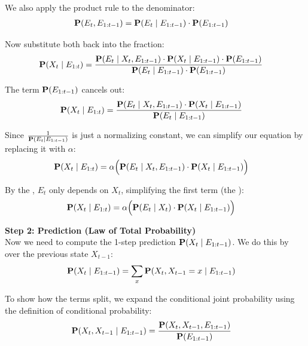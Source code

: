 We also apply the product rule to the denominator:
\begin{align*}
\textbf{P}(E_t, E_{1:t-1}) &= \textbf{P}(E_t \mid E_{1:t-1}) \cdot \textbf{P}(E_{1:t-1})
\end{align*}

Now substitute both back into the fraction:
\begin{align*}
\textbf{P}(X_t \mid E_{1:t}) &= \frac{\textbf{P}(E_t \mid X_t, E_{1:t-1}) \cdot \textbf{P}(X_t \mid E_{1:t-1}) \cdot \textbf{P}(E_{1:t-1})}{\textbf{P}(E_t \mid E_{1:t-1}) \cdot \textbf{P}(E_{1:t-1})}
\end{align*}

The term $\textbf{P}(E_{1:t-1})$ cancels out:
\begin{align*}
\textbf{P}(X_t \mid E_{1:t}) &= \frac{\textbf{P}(E_t \mid X_t, E_{1:t-1}) \cdot \textbf{P}(X_t \mid E_{1:t-1})}{\textbf{P}(E_t \mid E_{1:t-1})}
\end{align*}

Since $\frac{1}{\textbf{P}(E_t \mid E_{1:t-1})}$ is just a normalizing constant, we can simplify our equation by replacing it with $\alpha$:
\begin{align*}
\textbf{P}(X_t \mid E_{1:t}) &= \alpha \Big( \textbf{P}(E_t \mid X_t, E_{1:t-1}) \cdot \textbf{P}(X_t \mid E_{1:t-1}) \Big)
\end{align*}

By the , $E_t$ only depends on $X_t$, simplifying the first term (the ):
\begin{align*}
\textbf{P}(X_t \mid E_{1:t}) &= \alpha \Big( \textbf{P}(E_t \mid X_t) \cdot \textbf{P}(X_t \mid E_{1:t-1}) \Big)
\end{align*}

\textbf{Step 2: Prediction (Law of Total Probability)} \\
Now we need to compute the 1-step prediction $\textbf{P}(X_t \mid E_{1:t-1})$. We do this by  over the previous state $X_{t-1}$:
\begin{align*}
\textbf{P}(X_t \mid E_{1:t-1}) &= \sum_{x} \textbf{P}(X_t, X_{t-1} = x \mid E_{1:t-1})
\end{align*}

To show how the terms split, we expand the conditional joint probability using the definition of conditional probability:
\begin{align*}
\textbf{P}(X_t, X_{t-1} \mid E_{1:t-1}) &= \frac{\textbf{P}(X_t, X_{t-1}, E_{1:t-1})}{\textbf{P}(E_{1:t-1})}
\end{align*}

